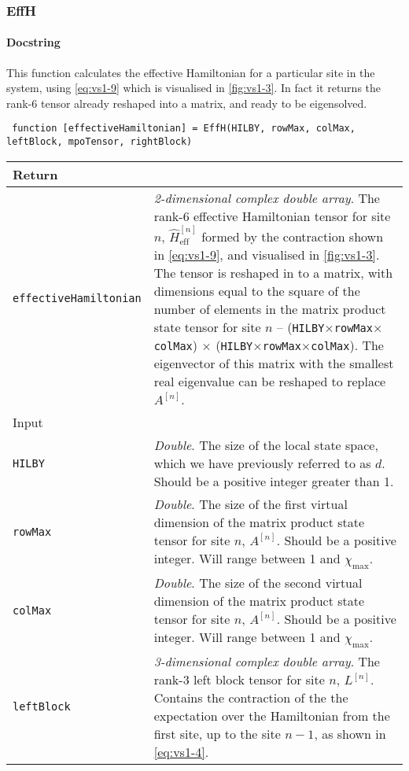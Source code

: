  \subsubsection{EffH}
 \paragraph{Docstring} This function calculates the effective Hamiltonian for a particular site in the system, using \cref{eq:vs1-9} which is visualised in \cref{fig:vs1-3}. In fact it returns the rank-6 tensor already reshaped into a matrix, and ready to be eigensolved.
 \begin{lstlisting}
 function [effectiveHamiltonian] = EffH(HILBY, rowMax, colMax, leftBlock, mpoTensor, rightBlock) \end{lstlisting}
 \begin{longtabu}{X[1,l]X[2,l]}
 \hline
 Return & \\ \hline
 \lstinline$effectiveHamiltonian$ & \emph{2-dimensional complex double array}. The rank-6 effective Hamiltonian tensor for site \(n\), \(\hat{H}_{\mathrm{eff}}^{[n]}\) formed by the contraction shown in \cref{eq:vs1-9}, and visualised in \cref{fig:vs1-3}. The tensor is reshaped in to a matrix, with dimensions equal to the square of the number of elements in the matrix product state tensor for site \(n\) -- (\lstinline$HILBY$\( \times \)\lstinline$rowMax$\( \times \)\lstinline$colMax$) \(\times\) (\lstinline$HILBY$\( \times \)\lstinline$rowMax$\( \times \)\lstinline$colMax$). The eigenvector of this matrix with the smallest real eigenvalue can be reshaped to replace \(A^{[n]}\). \\ \hline
 Input & \\ \hline
 \lstinline$HILBY$ & \emph{Double}. The size of the local state space, which we have previously referred to as \(d\). Should be a positive integer greater than 1. \\
 \lstinline$rowMax$ & \emph{Double}. The size of the first virtual dimension of the matrix product state tensor for site \(n\), \(A^{[n]}\). Should be a positive integer. Will range between 1 and \(\chi_{\mathrm{max}}\).\\
 \lstinline$colMax$ & \emph{Double}. The size of the second virtual dimension of the matrix product state tensor for site \(n\), \(A^{[n]}\). Should be a positive integer. Will range between 1 and \(\chi_{\mathrm{max}}\).\\
 \lstinline$leftBlock$ & \emph{3-dimensional complex double array}. The rank-3 left block tensor for site \(n\), \(L^{[n]}\). Contains the contraction of the the expectation over the Hamiltonian from the first site, up to the site \(n-1\), as shown in \cref{eq:vs1-4}.\\

\end{longtabu}
